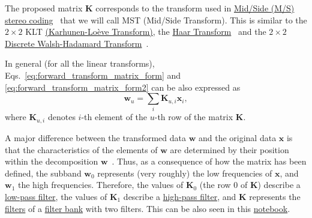 The proposed matrix ${\mathbf K}$ corresponds to the transform used in
\href{https://en.wikipedia.org/wiki/Joint_encoding#M/S_stereo_coding}{Mid/Side
  (M/S) stereo coding}~\cite{bosi2003intro} that we will call MST
(Mid/Side Transform). This is similar to the $2\times 2$ KLT
\href{http://fourier.eng.hmc.edu/e161/lectures/klt/node3.html}{(Karhunen-Lo\`eve
  Transform)}, the
\href{http://wavelets.pybytes.com/wavelet/haar/}{Haar
  Transform}~\cite{vetterli1995wavelets} and the $2\times 2$
\href{https://en.wikipedia.org/wiki/Hadamard_transform}{Discrete
  Walsh-Hadamard Transform}~\cite{sayood2017introduction}.

In general (for all the linear transforms),
Eqs.~\ref{eq:forward_transform_matrix_form} and
\ref{eq:forward_transform_matrix_form2} can be also expressed as
\begin{equation}
  {\mathbf w}_u = \sum_i {\mathbf K}_{u,i}{\mathbf x}_i,
  \label{eq:forward_transform_linear_combination_form}
\end{equation}
where ${\mathbf K}_{u,i}$ denotes $i$-th element of the $u$-th row of
the matrix ${\mathbf K}$.

A major difference between the transformed data ${\mathbf w}$ and the
original data ${\mathbf x}$ is that the characteristics of the
elements of ${\mathbf w}$ are determined by their position within the
decomposition ${\mathbf w}$~\cite{sayood2017introduction}. Thus, as a
consequence of how the matrix has been defined, the subband ${\mathbf
  w}_0$ represents (very roughly) the low frequencies of ${\mathbf
  x}$, and ${\mathbf w}_1$ the high frequencies. Therefore, the values
of ${\mathbf K}_0$ (the row 0 of ${\mathbf K}$) describe a
\href{https://en.wikipedia.org/wiki/Low-pass_filter}{low-pass filter},
the values of ${\mathbf K}_1$ describe a
\href{https://en.wikipedia.org/wiki/High-pass_filter}{high-pass
  filter}, and ${\mathbf K}$ represents the
\href{https://en.wikipedia.org/wiki/Digital_filter}{filters} of a
\href{https://en.wikipedia.org/wiki/Filter_bank}{filter bank} with two
filters. This can be also seen in this
\href{https://github.com/Tecnologias-multimedia/Tecnologias-multimedia.github.io/blob/master/study_guide/11-stereo_coding/stereo_transforms_RD.ipynb}{notebook}.

